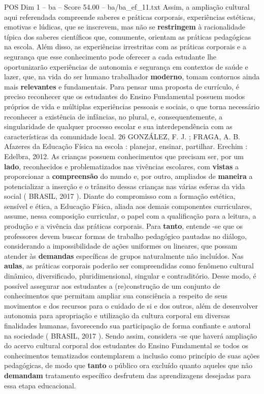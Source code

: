 \begin{textsample}{POS Dim 1 – ba – Score 54.00 – ba/ba\_ef\_11.txt}
Assim, a ampliação cultural aqui referendada compreende saberes e práticas corporais, experiências estéticas, emotivas e lúdicas, que se inscrevem, mas não se \textbf{restringem} à racionalidade típica dos saberes científicos que, comumente, orientam as práticas pedagógicas na escola.
Além disso, as experiências irrestritas com as práticas corporais e a segurança que esse conhecimento pode oferecer a cada estudante lhe oportunizarão experiências de autonomia e segurança em contextos de saúde e lazer, que, na vida do ser humano trabalhador \textbf{moderno}, tomam contornos ainda mais \textbf{relevantes} e fundamentais.
Para pensar uma proposta de currículo, é preciso reconhecer que os estudantes do Ensino Fundamental possuem modos próprios de vida e múltiplas experiências pessoais e sociais, o que torna necessário reconhecer a existência de infâncias, no plural, e, consequentemente, a singularidade de qualquer processo escolar e sua interdependência com as características da comunidade local. 26 GONZÁLEZ, F.
J. ; FRAGA, A.
B.
Afazeres da Educação Física na escola : planejar, ensinar, partilhar.
Erechim : Edelbra, 2012.
As crianças possuem conhecimentos que precisam ser, por um \textbf{lado}, reconhecidos e problematizados nas vivências escolares, com \textbf{vistas} a proporcionar a \textbf{compreensão} do mundo e, por outro, ampliados de \textbf{maneira} a potencializar a inserção e o trânsito dessas crianças nas várias esferas da vida social ( BRASIL, 2017 ).
Diante do compromisso com a formação estética, sensível e ética, a Educação Física, aliada aos demais componentes curriculares, assume, nessa composição curricular, o papel com a qualificação para a leitura, a produção e a vivência das práticas corporais.
Para \textbf{tanto}, entende -se que os professores devem buscar formas de trabalho pedagógico pautadas no diálogo, considerando a impossibilidade de ações uniformes ou lineares, que possam atender às \textbf{demandas} específicas de grupos naturalmente não incluídos.
Nas \textbf{aulas}, as práticas corporais poderão ser compreendidas como fenômeno cultural dinâmico, diversificado, pluridimensional, singular e contraditório.
Desse modo, é possível assegurar aos estudantes a (re)construção de um conjunto de conhecimentos que permitam ampliar sua consciência a respeito de seus movimentos e dos recursos para o cuidado de si e dos outros, além de desenvolver autonomia para apropriação e utilização da cultura corporal em diversas finalidades humanas, favorecendo sua participação de forma confiante e autoral na sociedade ( BRASIL, 2017 ).
Sendo assim, considera -se que haverá ampliação do acervo cultural corporal dos estudantes do Ensino Fundamental se todos os conhecimentos tematizados contemplarem a inclusão como princípio de suas ações pedagógicas, de modo que \textbf{tanto} o público ora excluído quanto aqueles que não \textbf{demandam} tratamento específico desfrutem das aprendizagens desejadas para essa etapa educacional.

\end{textsample}
